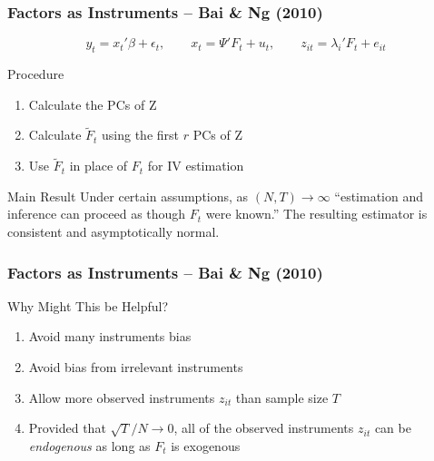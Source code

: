 \begin{frame}[c]\frametitle{Factors as Instruments -- Bai \& Ng (2010)}

\small

$$\boxed{
	y_t = x_t' \beta + \epsilon_t, \quad \quad
	x_t = \Psi'F_t + u_t, \quad \quad
	z_{it} = \lambda_i' F_t + e_{it}
}$$

\begin{block}
	{Procedure}
	\begin{enumerate}
		\item Calculate the PCs of Z
		\item Calculate $\widetilde{F}_t$ using the first $r$ PCs of Z
		\item Use $\widetilde{F}_t$ in place of $F_t$ for IV estimation
	\end{enumerate}
\end{block}

\vspace{-1em}

\begin{block}
	{Main Result}
	Under certain assumptions, as $(N,T) \rightarrow \infty$ ``estimation and inference can proceed as though $F_t$ were known.'' The resulting estimator is consistent and asymptotically normal.
\end{block}

\normalsize

\end{frame}
\begin{frame}[c]\frametitle{Factors as Instruments -- Bai \& Ng (2010)}
    
\begin{block}
	{Why Might This be Helpful?}
	\begin{enumerate}
		\item Avoid many instruments bias
		\item Avoid bias from irrelevant instruments
		\item Allow more observed instruments $z_{it}$ than sample size $T$
		\item Provided that $\sqrt{T}/N \rightarrow 0$, all of the observed instruments $z_{it}$ can be \emph{endogenous} as long as $F_t$ is exogenous
	\end{enumerate}
\end{block}

\end{frame}
